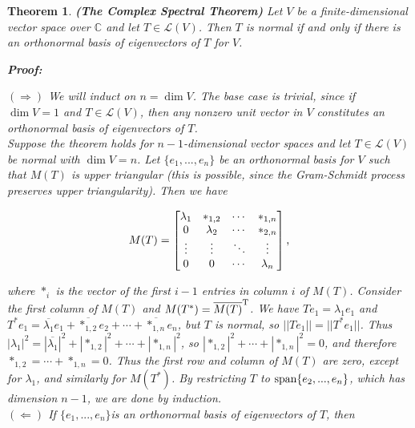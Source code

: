 \documentclass{article}
\theoremstyle{colontheorem}
\newtheorem{theorem}{Theorem}[section]
\newcommand{\Span}{\textnormal{span}}
\newenvironment{Theorem}
{
	\begin{mdframed}[backgroundcolor=TheoremOrange!10]
	\begin{theorem}
}
{
	\end{theorem}
	\end{mdframed}
	
	\vspace{.15in}
}
\newenvironment{Proof}
{
	\begin{mdframed}[backgroundcolor=ProofPurple!10]
	\textbf{Proof:}%
}
{
	\end{mdframed}
	
	\vspace{.085in}
}
\begin{document}
\begin{Theorem}
	
	\textbf{(The Complex Spectral Theorem)} Let $V$ be a finite-dimensional vector space over $\mathbb{C}$ and let $T \in \mathcal{L}(V)$. Then $T$ is normal if and only if there is an orthonormal basis of eigenvectors of $T$ for $V$.
	
	\begin{Proof}
		$(\Rightarrow)$ We will induct on $n = \dim V$. The base case is trivial, since if $\dim V = 1$ and $T \in \mathcal{L}(V)$, then any nonzero unit vector in $V$ constitutes an orthonormal basis of eigenvectors of $T$.\\
		
		Suppose the theorem holds for $n - 1$-dimensional vector spaces and let $T \in \mathcal{L}(V)$ be normal with $\dim V = n$. Let $\{e_1, ..., e_n\}$ be an orthonormal basis for $V$ such that $M(T)$ is upper triangular (this is possible, since the Gram-Schmidt process preserves upper triangularity). Then we have
		
		$$
			M(T) = \begin{bmatrix}
				\lambda_1 & *_{1,2} & \cdots & *_{1,n}\\
				0 & \lambda_2 & \cdots & *_{2,n}\\
				\vdots & \vdots & \ddots & \vdots\\
				0 & 0 & \cdots & \lambda_n 
			\end{bmatrix} \textnormal{,}
		$$
		
		where $*_i$ is the vector of the first $i - 1$ entries in column $i$ of $M(T)$. Consider the first column of $M(T)$ and $M(T^*) = \overline{M(T)}^\textnormal{T}$. We have $Te_1 = \lambda_1 e_1$ and $T^* e_1 = \overline{\lambda_1} e_1 + \overline{*_{1,2}} e_2 + \cdots + \overline{*_{1,n}} e_n$, but $T$ is normal, so $||Te_1|| = ||T^* e_1||$. Thus $|\lambda_1|^2 = |\overline{\lambda_1}|^2 + |*_{1,2}|^2 + \cdots + |*_{1,n}|^2$, so $|*_{1,2}|^2 + \cdots + |*_{1,n}|^2 = 0$, and therefore $*_{1,2} = \cdots + *_{1,n} = 0$. Thus the first row and column of $M(T)$ are zero, except for $\lambda_1$, and similarly for $M(T^*)$. By restricting $T$ to $\Span \{e_2, ..., e_n\}$, which has dimension $n - 1$, we are done by induction.\\
		
		$(\Leftarrow)$ If $\{e_1, ..., e_n\}$is an orthonormal basis of eigenvectors of $T$, then
		

\end{Proof}
\end{Theorem}
\end{document}
